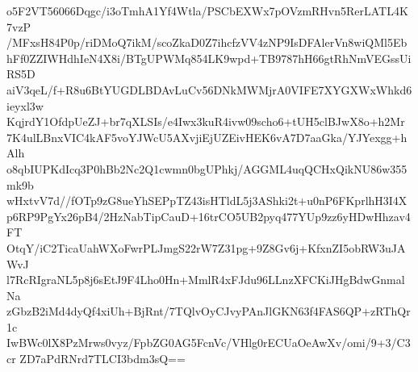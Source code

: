 o5F2VT56066Dqgc/i3oTmhA1Yf4Wtla/PSCbEXWx7pOVzmRHvn5RerLATL4K7vzP
/MFxsH84P0p/riDMoQ7ikM/scoZkaD0Z7ihcfzVV4zNP9IsDFAlerVn8wiQMl5Eb
hFf0ZZIWHdhIeN4X8i/BTgUPWMq854LK9wpd+TB9787hH66gtRhNmVEGssUiRS5D
aiV3qeL/f+R8u6BtYUGDLBDAvLuCv56DNkMWMjrA0VIFE7XYGXWxWhkd6ieyxl3w
KqjrdY1OfdpUeZJ+br7qXLSIs/e4Iwx3kuR4ivw09scho6+tUH5clBJwX8o+h2Mr
7K4ulLBnxVIC4kAF5voYJWcU5AXvjiEjUZEivHEK6vA7D7aaGka/YJYexgg+hAlh
o8qbIUPKdIcq3P0hBb2Nc2Q1cwmn0bgUPhkj/AGGML4uqQCHxQikNU86w355mk9b
wHxtvV7d//fOTp9zG8ueYhSEPpTZ43isHTldL5j3AShki2t+u0nP6FKprlhH3I4X
p6RP9PgYx26pB4/2HzNabTipCauD+16trCO5UB2pyq477YUp9zz6yHDwHhzav4FT
OtqY/iC2TicaUahWXoFwrPLJmgS22rW7Z31pg+9Z8Gv6j+KfxnZI5obRW3uJAWvJ
l7RcRIgraNL5p8j6sEtJ9F4Lho0Hn+MmlR4xFJdu96LLnzXFCKiJHgBdwGnmalNa
zGbzB2iMd4dyQf4xiUh+BjRnt/7TQlvOyCJvyPAnJlGKN63f4FAS6QP+zRThQr1c
IwBWc0lX8PzMrws0vyz/FpbZG0AG5FcnVc/VHlg0rECUaOeAwXv/omi/9+3/C3cr
ZD7aPdRNrd7TLCI3bdm3sQ==
